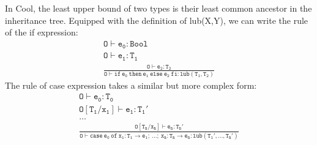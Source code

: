 In Cool, the least upper bound of two types is their least common ancestor in the inheritance tree. Equipped with the definition of lub(X,Y), we can write the rule of the if expression:
\begin{gather*}
\mathtt{O\vdash e_0: Bool}\\
\mathtt{O\vdash e_1: T_1}\\
\mathtt{\frac{O\vdash e_2:T_2}{ O\vdash if\:e_0\:then\:e_1\:else\:e_2\:fi:lub(T_1, T_2)}}
\end{gather*}
The rule of case expression takes a similar but more complex form:
\begin{gather*}
\mathtt{O\vdash e_0:T_0}\\
\mathtt{O[T_1/x_1]\vdash e_1:T_1'}\\
\dots\\
\mathtt{\frac{O[T_n/x_n]\vdash e_n:T_n'}{O\vdash case\:e_0\:of\:x_1:T_1\rightarrow e_1;\:\dots;\: x_n:T_n\rightarrow e_n: lub(T_1',\dots,T_n')}}
\end{gather*}
